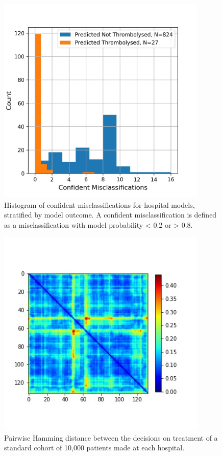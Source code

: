 \documentclass[12pt,a4paper, pdftex]{elsarticle}
\begin{document}
\begin{figure}[h]
\centering
\includegraphics[width=10cm]{figures/missclassified_histogram.jpg}
\caption{Histogram of confident misclassifications for hospital models, stratified by model outcome. A confident misclassification is defined as a misclassification with model probability < 0.2 or > 0.8.}
\label{fig:missed}
\end{figure}

\begin{figure}[h]
\centering
\includegraphics[width=10cm]{figures/cohort_distance_all.jpg}
\caption{Pairwise Hamming distance between the decisions on treatment of a standard cohort of 10,000 patients made at each hospital.}
\label{fig:cohort_distance_all}
\end{figure}

\end{document}

